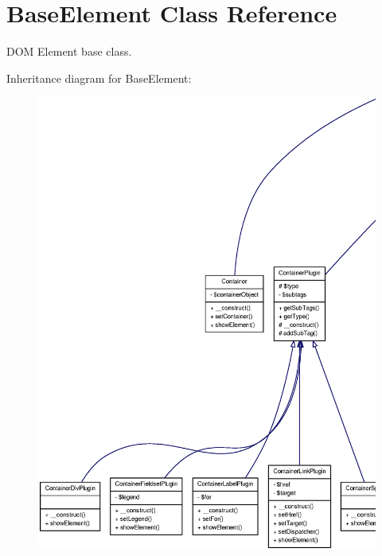 \section{BaseElement Class Reference}
\label{classBaseElement}


DOM Element base class.  




Inheritance diagram for BaseElement:\nopagebreak
\begin{figure}[H]
\begin{center}
\leavevmode
\includegraphics[width=400pt]{classBaseElement__inherit__graph}
\end{center}
\end{figure}


